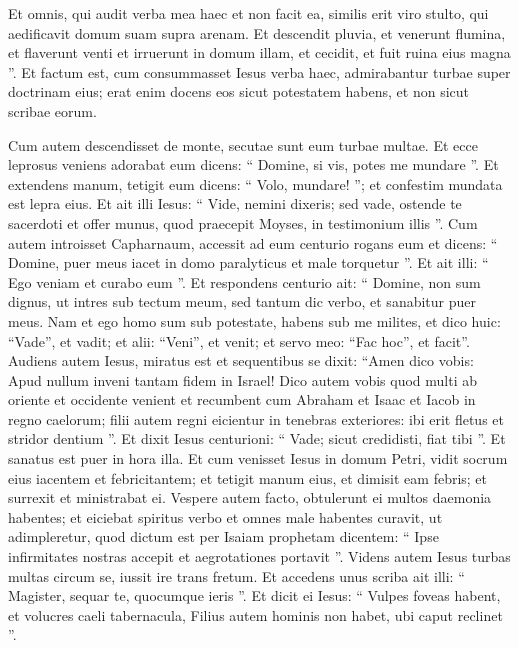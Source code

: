 \begin{biblechapter}
\begin{biblechapter}
\begin{biblechapter}
\begin{biblechapter}
\begin{biblechapter}
\begin{biblechapter}
\begin{biblechapter}
 \verse Et omnis, qui audit verba mea haec et non facit ea, similis erit viro stulto, qui aedificavit domum suam supra arenam. 
\verse Et descendit pluvia, et venerunt flumina, et flaverunt venti et irruerunt in domum illam, et cecidit, et fuit ruina eius magna ”.
 \verse Et factum est, cum consummasset Iesus verba haec, admirabantur turbae super doctrinam eius; 
\verse erat enim docens eos sicut potestatem habens, et non sicut scribae eorum.
 
\begin{biblechapter}
\verse Cum autem descendisset de monte, secutae sunt eum turbae multae.
 \verse Et ecce leprosus veniens adorabat eum dicens: “ Domine, si vis, potes me mundare ”. 
\verse Et extendens manum, tetigit eum dicens: “ Volo, mundare! ”; et confestim mundata est lepra eius. 
\verse Et ait illi Iesus: “ Vide, nemini dixeris; sed vade, ostende te sacerdoti et offer munus, quod praecepit Moyses, in testimonium illis ”.
 \verse Cum autem introisset Capharnaum, accessit ad eum centurio rogans eum 
\verse et dicens: “ Domine, puer meus iacet in domo paralyticus et male torquetur ”. 
\verse Et ait illi: “ Ego veniam et curabo eum ”. 
\verse Et respondens centurio ait: “ Domine, non sum dignus, ut intres sub tectum meum, sed tantum dic verbo, et sanabitur puer meus. 
\verse Nam et ego homo sum sub potestate, habens sub me milites, et dico huic: “Vade”, et vadit; et alii: “Veni”, et venit; et servo meo: “Fac hoc”, et facit”.
 \verse Audiens autem Iesus, miratus est et sequentibus se dixit: “Amen dico vobis: Apud nullum inveni tantam fidem in Israel! 
\verse Dico autem vobis quod multi ab oriente et occidente venient et recumbent cum Abraham et Isaac et Iacob in regno caelorum; 
\verse filii autem regni eicientur in tenebras exteriores: ibi erit fletus et stridor dentium ”. 
\verse Et dixit Iesus centurioni: “ Vade; sicut credidisti, fiat tibi ”. Et sanatus est puer in hora illa.
 \verse Et cum venisset Iesus in domum Petri, vidit socrum eius iacentem et febricitantem; 
\verse et tetigit manum eius, et dimisit eam febris; et surrexit et ministrabat ei.
 \verse Vespere autem facto, obtulerunt ei multos daemonia habentes; et eiciebat spiritus verbo et omnes male habentes curavit, 
\verse ut adimpleretur, quod dictum est per Isaiam prophetam dicentem:
 “ Ipse infirmitates nostras accepit
 et aegrotationes portavit ”.
 \verse Videns autem Iesus turbas multas circum se, iussit ire trans fretum. 
\verse Et accedens unus scriba ait illi: “ Magister, sequar te, quocumque ieris ”. 
 \verse Et dicit ei Iesus: “ Vulpes foveas habent, et volucres caeli tabernacula, Filius autem hominis non habet, ubi caput reclinet ”.

\end{biblechapter}
\end{biblechapter}
\end{biblechapter}
\end{biblechapter}
\end{biblechapter}
\end{biblechapter}
\end{biblechapter}
\end{biblechapter}
